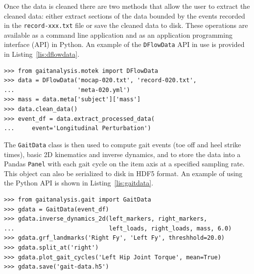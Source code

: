 \documentclass[fleqn,12pt]{wlpeerj}
\begin{document}
Once the data is cleaned there are two methods that allow the user to extract
the cleaned data: either extract sections of the data bounded by the events
recorded in the \verb|record-xxx.txt| file or save the cleaned data to disk.
These operations are available as a command line application and as an
application programming interface (API) in Python. An example of the
\verb|DFlowData| API in use is provided in Listing~\ref{lis:dflowdata}.
%
\begin{listing}
  \begin{verbatim}
>>> from gaitanalysis.motek import DFlowData
>>> data = DFlowData('mocap-020.txt', 'record-020.txt',
...                  'meta-020.yml')
>>> mass = data.meta['subject']['mass']
>>> data.clean_data()
>>> event_df = data.extract_processed_data(
...     event='Longitudinal Perturbation')
  \end{verbatim}
  \cprotect\caption{Python interpreter session showing how one could load a
    trial into memory, extract the subject's mass from the meta data, run the
    data cleaning process, and finally extract a Pandas \verb|DataFrame|
    containing all of the time histories for a specific event in the trial.}
  \label{lis:dflowdata}
\end{listing}

The \verb|GaitData| class is then used to compute gait events (toe off and heel
strike times), basic 2D kinematics and inverse dynamics, and to store the data
into a Pandas \verb|Panel| with each gait cycle on the item axis at a specified
sampling rate. This object can also be serialized to disk in HDF5 format. An
example of using the Python API is shown in Listing~\ref{lis:gaitdata}.
%
\begin{listing}
  \begin{verbatim}
>>> from gaitanalysis.gait import GaitData
>>> gdata = GaitData(event_df)
>>> gdata.inverse_dynamics_2d(left_markers, right_markers,
...                           left_loads, right_loads, mass, 6.0)
>>> gdata.grf_landmarks('Right Fy', 'Left Fy', threshhold=20.0)
>>> gdata.split_at('right')
>>> gdata.plot_gait_cycles('Left Hip Joint Torque', mean=True)
>>> gdata.save('gait-data.h5')
  \end{verbatim}
  \cprotect\caption{Python interpreter session showing how one could use the
    \verb|GaitData| class to load in the result of \verb|DFlowData| and compute
    the inverse dynamics (joint angles and torques), identify the gait events
    (e.g. heel strikes), split the data with respect to the gait events into a
    Pandas \verb|Panel|, plot the mean and standard deviation of one time
    history with respect to the gait cycles, and save the data to disk.}
  \label{lis:gaitdata}
\end{listing}
\end{document}
